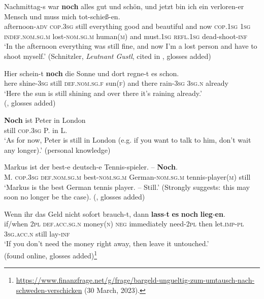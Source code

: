 \begin{exe}
	\ex 
	\gll Nachmittag-s war \textbf{noch} alles gut und schön, und jetzt bin ich ein verloren-er Mensch und muss mich tot-schieß-en.\\
afternoon-\textsc{adv} \textsc{cop}.3\textsc{sg} still everything good and beautiful and now \textsc{cop}.1\textsc{sg} 1\textsc{sg} \textsc{indef}.\textsc{nom}.\textsc{sg}.\textsc{m} lost-\textsc{nom}.\textsc{sg}.\textsc{m} human(\textsc{m}) and must.1\textsc{sg} \textsc{refl}.1\textsc{sg} dead-shoot-\textsc{inf}\\
\glt \lq In the afternoon everything was still fine, and now I'm a lost person and have to shoot myself.' (Schnitzler, \textit{Leutnant Gustl}, cited in \cite[45]{Shetter1966}, glosses added)

	\ex
	\gll Hier schein-t \textbf{noch} die Sonne und dort regne-t es schon.\\
	here shine-3\textsc{sg} still \textsc{def}.\textsc{nom}.\textsc{sg}.\textsc{f} sun(\textsc{f}) and there rain-3\textsc{sg} 3\textsc{sg}.\textsc{n} already\\
	\glt \lq Here the sun is still shining and over there it's raining already.'
	\\(\cite[169]{Doherty1973}, glosses added)

	\ex\label{exAppendixGerman3}
	\gll \textbf{Noch} ist Peter in London\\
	still \textsc{cop}.3\textsc{sg} P. in L.\\
	\glt \lq As for now, Peter is still in London (e.g. if you want to talk to him, don't wait any longer).'  (personal knowledge)

	\ex\label{exAppendixGerman4}
	\gll Markus ist der best-e deutsch-e Tennis-spieler. – \textbf{Noch}.\\
	M. \textsc{cop}.3\textsc{sg} \textsc{def}.\textsc{nom}.\textsc{sg}.\textsc{m} best-\textsc{nom}.\textsc{sg}.\textsc{m} German-\textsc{nom}.\textsc{sg}.\textsc{m} tennis-player(\textsc{m}) {} still\\
	\glt \lq Markus is the best German tennis player. -- Still.' (Strongly suggests: this may soon no longer be the case). (\cite[287]{Klein2018}, glosses added)
	
	\ex\label{exAppendixGerman5}
	\gll Wenn ihr das Geld nicht sofort brauch-t, dann \textbf{lass}-\textbf{t} \textbf{es} \textbf{noch} \textbf{lieg}-\textbf{en}.\\
	if/when 2\textsc{pl} \textsc{def}.\textsc{acc}.\textsc{sg}.\textsc{n} money(\textsc{n}) \textsc{neg} immediately need-2\textsc{pl} then let.\textsc{imp}-\textsc{pl} 3\textsc{sg}.\textsc{acc}.\textsc{n} still lay-\textsc{inf}\\
	\glt \lq If you don't need the money right away, then leave it untouched.\rq{}
	\\(found online, glosses added)\footnote{\url{https://www.finanzfrage.net/g/frage/bargeld-ungueltig-zum-umtausch-nach-schweden-verschicken} (30 March, 2023).}

\end{exe}
\largerpage[-1]\pagebreak
